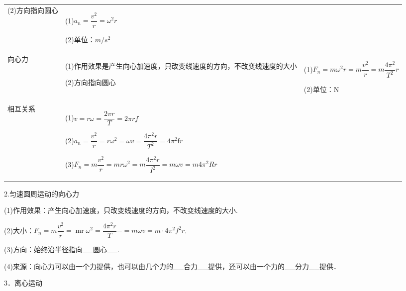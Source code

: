 \begin{longtable}[]{@{}m{2cm}m{9cm}m{4cm}@{}}
\begin{minipage}[t]{0.60\columnwidth}
(2)方向指向圆心\strut
\end{minipage} & \begin{minipage}[t]{0.30\columnwidth}\raggedright
(1)$a_{n}=\dfrac{v^{2}}{r}=\omega^{2} r$

(2)单位：$m/s^2 $\strut
\end{minipage}\tabularnewline
\begin{minipage}[t]{0.50\columnwidth}\raggedright
向心力\strut
\end{minipage} & \begin{minipage}[t]{0.60\columnwidth}\raggedright
(1)作用效果是产生向心加速度，只改变线速度的方向，不改变线速度的大小

(2)方向指向圆心\strut
\end{minipage} & \begin{minipage}[t]{0.30\columnwidth}\raggedright
(1)$F_{n}=m \omega^{2} r=m \dfrac{v^{2}}{r}=m \dfrac{4 \pi^{2}}{T^{2}} r$

(2)单位：N\strut
\end{minipage}\tabularnewline
\begin{minipage}[t]{0.50\columnwidth}\raggedright
相互关系\strut
\end{minipage} & \begin{minipage}[t]{0.60\columnwidth}\raggedright
(1)$v=r \omega=\dfrac{2 \pi r}{T}=2 \pi r f$

(2)$a_{n}=\dfrac{v^{2}}{r}=r \omega^{2}=\omega v=\dfrac{4 \pi^{2} r}{T^{2}}=4 \pi^{2} \mathrm{f}r$

(3)$F_{n}=m \dfrac{v^{2}}{r}=m r \omega^{2}=m \dfrac{4 \pi^{2} r}{I^{2}}=m \omega v=m 4 \pi^{2} R r$\strut
\end{minipage} & \begin{minipage}[t]{0.30\columnwidth}\raggedright
\strut
\end{minipage}\tabularnewline
\bottomrule
\end{longtable}

2.匀速圆周运动的向心力

(1)作用效果：产生向心加速度，只改变线速度的方向，不改变线速度的大小.

(2)大小：$F_{n}=m\dfrac{v^2}{r}=\operatorname{mr} \omega^{2}=\dfrac{{4 \pi^{2}} r}{{T}}-=m \omega v=m \cdot 4 \pi^{2} f^2 r$.

(3)方向：始终沿半径指向\_\_圆心\_\_.

(4)来源：向心力可以由一个力提供，也可以由几个力的\_\_合力\_\_提供，还可以由一个力的\_\_分力\_\_提供．

3．离心运动

